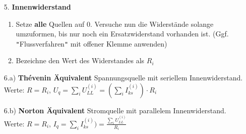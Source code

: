 																				  \iend
																				\begin{itemize}

																				  \item[5.] \textbf{Innenwiderstand}
																				  \begin{enumerate}
																				    \item Setze \textbf{alle} Quellen auf 0. Versuche nun die Widerstände solange umzuformen, bis nur noch ein Ersatzwiderstand vorhanden ist. (Ggf. \texttt{"}Flussverfahren\texttt{"} mit offener Klemme anwenden)
																				    \item Bezeichne den Wert des Widerstandes als $R_i$
																				  \end{enumerate}
																				  \item[6.a)] \textbf{Thévenin Äquivalent} Spannungsquelle mit seriellem Innenwiderstand. \\
																				  Werte: $\displaystyle   R= R_i$, $U_q = \sum_i U_{LL}^{(i)} = (\sum_i I_{ks}^{(i)})\cdot R_i$

																				  \item[6.b)] \textbf{Norton Äquivalent} Stromquelle mit parallelem Innenwiderstand. \\
																				  Werte: $\displaystyle  R= R_i$, $I_q = \sum_i I_{ks}^{(i)}) = \frac{\sum_i U_{LL}^{(i)}}{R_i}$

																				  \end{itemize}

